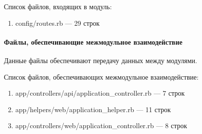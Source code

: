 Список файлов, входящих в модуль:
\begin{enumerate}[label=\arabic*)]
\item config/routes.rb --- 29 строк
\end{enumerate}


\paragraph{Файлы, обеспечивающие межмодульное взаимодействие}

Данные файлы обеспечивают передачу данных между модулями.

Список файлов, обеспечивающих межмодульное взаимодействие:
\begin{enumerate}[label=\arabic*)]
\item app/controllers/api/application\_controller.rb --- 7 строк
\item app/helpers/web/application\_helper.rb --- 11 строк
\item app/controllers/web/application\_controller.rb --- 8 строк
\end{enumerate}
